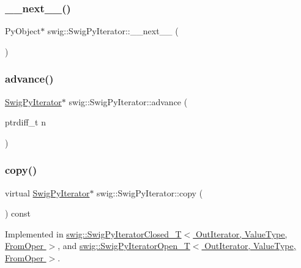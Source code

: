 \subsubsection{\texorpdfstring{\+\_\+\+\_\+next\+\_\+\+\_\+()}{\_\_next\_\_()}}
{\footnotesize\ttfamily Py\+Object$\ast$ swig\+::\+Swig\+Py\+Iterator\+::\+\_\+\+\_\+next\+\_\+\+\_\+ (\begin{DoxyParamCaption}{ }\end{DoxyParamCaption})\hspace{0.3cm}{\ttfamily [inline]}}

\mbox{\label{structswig_1_1_swig_py_iterator_ac14880767f73c71e8adb59cac6bed3ef}} 
\subsubsection{\texorpdfstring{advance()}{advance()}}
{\footnotesize\ttfamily \hyperlink{structswig_1_1_swig_py_iterator}{Swig\+Py\+Iterator}$\ast$ swig\+::\+Swig\+Py\+Iterator\+::advance (\begin{DoxyParamCaption}\item[{ptrdiff\+\_\+t}]{n }\end{DoxyParamCaption})\hspace{0.3cm}{\ttfamily [inline]}}

\mbox{\label{structswig_1_1_swig_py_iterator_ae74c4b06f59975d9df19b30780cdefc1}} 
\subsubsection{\texorpdfstring{copy()}{copy()}}
{\footnotesize\ttfamily virtual \hyperlink{structswig_1_1_swig_py_iterator}{Swig\+Py\+Iterator}$\ast$ swig\+::\+Swig\+Py\+Iterator\+::copy (\begin{DoxyParamCaption}{ }\end{DoxyParamCaption}) const\hspace{0.3cm}{\ttfamily [pure virtual]}}



Implemented in \hyperlink{classswig_1_1_swig_py_iterator_closed___t_afa43a5af55b0f4ddee56308cb6c72eba}{swig\+::\+Swig\+Py\+Iterator\+Closed\+\_\+\+T$<$ Out\+Iterator, Value\+Type, From\+Oper $>$}, and \hyperlink{classswig_1_1_swig_py_iterator_open___t_a98aa48ae93af61706ec3b587d2c7dda6}{swig\+::\+Swig\+Py\+Iterator\+Open\+\_\+\+T$<$ Out\+Iterator, Value\+Type, From\+Oper $>$}.

